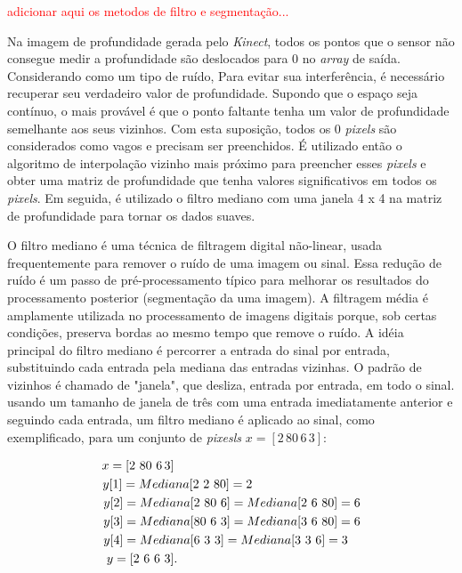 \textcolor{red}{adicionar aqui os metodos de filtro e segmentação...}


 Na imagem de profundidade gerada pelo \textit{Kinect}, todos os pontos que o sensor não consegue medir a profundidade são deslocados para 0 no \textit{array} de saída. Considerando  como um tipo de ruído, Para evitar sua interferência, é necessário recuperar seu verdadeiro valor de profundidade. Supondo que o espaço seja contínuo, o mais provável é que o ponto faltante tenha um valor de profundidade semelhante aos seus vizinhos. Com esta suposição, todos os 0 \textit{pixels} são considerados como vagos e precisam ser preenchidos. É utilizado então o algoritmo de interpolação vizinho mais próximo para preencher esses \textit{pixels} e obter uma matriz de profundidade que tenha valores significativos em todos os \textit{pixels}. Em seguida, é utilizado o filtro mediano com uma janela 4 x 4 na matriz de profundidade para tornar os dados suaves.

O filtro mediano é uma técnica de filtragem digital não-linear, usada frequentemente para remover o ruído de uma imagem ou sinal. Essa redução de ruído é um passo de pré-processamento típico para melhorar os resultados do processamento posterior (segmentação da uma imagem). A filtragem média é amplamente utilizada no processamento de imagens digitais porque, sob certas condições, preserva bordas ao mesmo tempo que remove o ruído. A idéia principal do filtro mediano é percorrer a entrada do sinal por entrada, substituindo cada entrada pela mediana das entradas vizinhas. O padrão de vizinhos é chamado de "janela", que desliza, entrada por entrada, em todo o sinal. usando um tamanho de janela de três com uma entrada imediatamente anterior e seguindo cada entrada, um filtro mediano é aplicado ao  sinal, como exemplificado, para um conjunto de \textit{pixesls} $x = [2\,80\, 6 \,3]$:

\begin{align*}
x = [2\,\, 80\,\, 6 \,3]\MoveEqLeft[23]\\
y[1] = Mediana[2\,\, 2\,\, 80] = 2\MoveEqLeft[16.7]\\
y[2] = Mediana[2\,\, 80\,\, 6] = Mediana[2\,\, 6\,\, 80] = 6\MoveEqLeft[8]\\
y[3] = Mediana[80\,\, 6\,\, 3] = Mediana[3\,\, 6\,\, 80] = 6\MoveEqLeft[8]\\
y[4] = Mediana[6\,\, 3\,\, 3] = Mediana[3\,\, 3\,\, 6] = 3\MoveEqLeft[9]\\
y = [2\,\, 6\,\, 6\,\, 3]\MoveEqLeft[23].
\end{align*}

